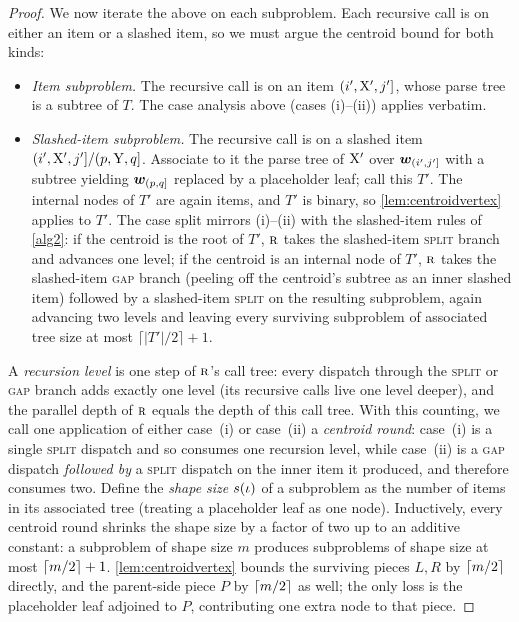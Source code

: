 \documentclass{article}
\begin{document}
\begin{proof}
    We now iterate the above on each subproblem. Each recursive call is on either an item or a slashed item, so we must argue the centroid bound for both kinds:
    \begin{itemize}
        \item \emph{Item subproblem.} The recursive call is on an item $({{ i}}', {{ \mathrm{X}}}', {{ j}}']$, whose parse tree is a subtree of $T$. The case analysis above (cases (i)--(ii)) applies verbatim.
        \item \emph{Slashed-item subproblem.} The recursive call is on a slashed item $({{ i}}', {{ \mathrm{X}}}', {{ j}}']/(p, {{ \mathrm{Y}}}, q]$. Associate to it the parse tree of ${{ \mathrm{X}}}'$ over ${{\boldsymbol{w}}}_{({{ i}}', {{ j}}']}$ with a subtree yielding ${{\boldsymbol{w}}}_{(p, q]}$ replaced by a placeholder leaf; call this $T'$. The internal nodes of $T'$ are again items, and $T'$ is binary, so \cref{lem:centroidvertex} applies to $T'$. The case split mirrors (i)--(ii) with the slashed-item rules of \cref{alg2}: if the centroid is the root of $T'$, ${\textsc{r}}$ takes the slashed-item \textsc{split} branch and advances one level; if the centroid is an internal node of $T'$, ${\textsc{r}}$ takes the slashed-item \textsc{gap} branch (peeling off the centroid's subtree as an inner slashed item) followed by a slashed-item \textsc{split} on the resulting subproblem, again advancing two levels and leaving every surviving subproblem of associated tree size at most $\lceil |T'|/2 \rceil + 1$.
    \end{itemize}
    A \emph{recursion level} is one step of ${\textsc{r}}$'s call tree: every dispatch through the \textsc{split} or \textsc{gap} branch adds exactly one level (its recursive calls live one level deeper), and the parallel depth of ${\textsc{r}}$ equals the depth of this call tree. With this counting, we call one application of either case~(i) or case~(ii) a \emph{centroid round}: case~(i) is a single \textsc{split} dispatch and so consumes one recursion level, while case~(ii) is a \textsc{gap} dispatch \emph{followed by} a \textsc{split} dispatch on the inner item it produced, and therefore consumes two.
    Define the \emph{shape size} $s({{ \iota}})$ of a subproblem as the number of items in its associated tree (treating a placeholder leaf as one node). 
    Inductively, every centroid round shrinks the shape size by a factor of two up to an additive constant: a subproblem of shape size $m$ produces subproblems of shape size at most $\lceil m/2\rceil + 1$. \cref{lem:centroidvertex} bounds the surviving pieces $L, R$ by $\lceil m/2\rceil$ directly, and the parent-side piece $P$ by $\lceil m/2\rceil$ as well; the only loss is the placeholder leaf adjoined to $P$, contributing one extra node to that piece.

\end{proof}
\end{document}
